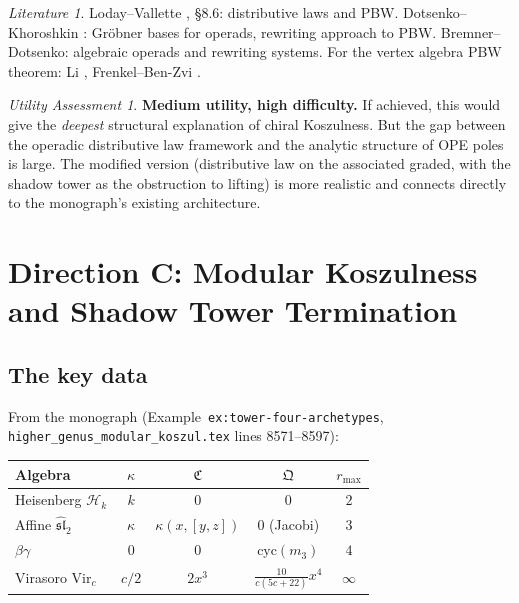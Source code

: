 \documentclass[11pt]{article}
\theoremstyle{definition}
\theoremstyle{remark}
\newtheorem*{assessment}{Utility Assessment}
\newtheorem*{literature}{Literature}
\newcommand{\Heis}{\mathcal{H}}
\newcommand{\Vir}{\mathrm{Vir}}
\begin{document}
\begin{literature}
Loday--Vallette \cite{LV12}, \S8.6: distributive laws and PBW.
Dotsenko--Khoroshkin \cite{DK10}: Gr\"obner bases for operads,
rewriting approach to PBW.  Bremner--Dotsenko: algebraic operads
and rewriting systems.  For the vertex algebra PBW theorem: Li
\cite{Li96}, Frenkel--Ben-Zvi \cite{FBZ04}.
\end{literature}

\begin{assessment}
\textbf{Medium utility, high difficulty.}  If achieved, this would
give the \emph{deepest} structural explanation of chiral
Koszulness.  But the gap between the operadic distributive law
framework and the analytic structure of OPE poles is large.
The modified version (distributive law on the associated graded,
with the shadow tower as the obstruction to lifting) is more
realistic and connects directly to the monograph's existing
architecture.
\end{assessment}

\section{Direction C: Modular Koszulness and Shadow Tower
Termination}
\label{sec:modular}

\subsection{The key data}

From the monograph
(Example~\texttt{ex:tower-four-archetypes},
\texttt{higher\_genus\_modular\_koszul.tex} lines 8571--8597):

\begin{center}
\begin{tabular}{lcccc}
\hline
\textbf{Algebra} & $\kappa$ & $\mathfrak{C}$ & $\mathfrak{Q}$ &
$r_{\max}$ \\
\hline
Heisenberg $\Heis_k$ & $k$ & $0$ & $0$ & $2$ \\
Affine $\widehat{\mathfrak{sl}}_2$ & $\kappa$ &
$\kappa(x,[y,z])$ & $0$ (Jacobi) & $3$ \\
$\beta\gamma$ & $0$ & $0$ & $\mathrm{cyc}(m_3)$ & $4$ \\
Virasoro $\Vir_c$ & $c/2$ & $2x^3$ &
$\frac{10}{c(5c+22)}x^4$ & $\infty$ \\
\hline
\end{tabular}
\end{center}
\end{document}
